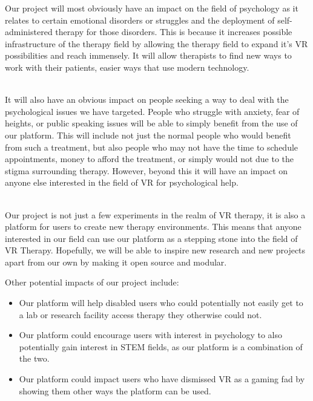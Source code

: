 \documentclass[a4paper,10pt]{article}
\begin{document}
	
	Our project will most obviously have an impact on the field of psychology as it relates to certain emotional disorders or struggles and the deployment of self-administered 
	therapy for those disorders.  This is because it increases possible infrastructure of the therapy field by allowing the therapy field to expand it's VR possibilities and reach immensely.  It will allow therapists to find new ways to work with their patients, easier ways that use modern technology.
	\par ~\\
	It will also have an obvious impact on people seeking a way to deal with the psychological issues we have targeted.  People who struggle with anxiety, fear of heights, or public speaking issues will be able to simply benefit from the use of our platform.  This will include not just the normal people who would benefit from such a treatment, but also people who may not have the time to schedule appointments, money to afford the treatment, or simply would not due to the stigma surrounding therapy.  However, beyond this it will have an impact on anyone else interested in the field of VR for psychological help.
	\par ~\\
	Our project is not just a few experiments in the realm of VR therapy, it is also a platform for users to create new therapy environments.  This means that anyone interested in our field can use our platform as a stepping stone into the field of VR Therapy.  Hopefully, we will be able to inspire new research and new projects apart from our own by making it open source and modular.
	\par 
	
	Other potential impacts of our project include:
	\begin{itemize}
		\item Our platform will help disabled users who could potentially not easily get to a lab or research facility access therapy they otherwise could not.
		\item Our platform could encourage users with interest in psychology to also potentially gain interest in STEM fields, as our platform is a combination of the two.
		\item Our platform could impact users who have dismissed VR as a gaming fad by showing them other ways the platform can be used.
	\end{itemize}
	\pagebreak
\end{document}
